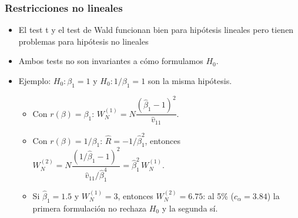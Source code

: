 \documentclass[t, compress, spanish, aspectratio=169]{beamer}
\begin{document}
\begin{frame}
    \frametitle{Restricciones no lineales}
    \begin{itemize}
        \item El test t y el test de Wald funcionan bien para hip\'otesis lineales pero tienen problemas para hip\'otesis no lineales 
        \item [] Ambos tests no son invariantes a c\'omo formulamos $H_0$.
        \item [] Ejemplo: $H_0:\beta_1=1$ y $H_0:1/\beta_1=1$ son la misma hip\'otesis.
        \begin{itemize}
            \item Con $r(\beta)=\beta_1$: $W_N^{(1)}=N\dfrac{(\hat\beta_1-1)^2}{\hat v_{11}}$.
            \item Con $r(\beta)=1/\beta_1$: $\hat R=-1/\hat\beta_1^2$, entonces $W_N^{(2)}=N\dfrac{(1/\hat\beta_1-1)^2}{\hat v_{11}/\hat\beta_1^4}=\hat\beta_1^2\, W_N^{(1)}$.
            \item Si $\hat\beta_1=1.5$ y $W_N^{(1)}=3$, entonces $W_N^{(2)}=6.75$: al 5\% ($c_\alpha=3.84$) la primera formulaci\'on no rechaza $H_0$ y la segunda s\'i.
        \end{itemize}
    \end{itemize}
\end{frame}
\end{document}
